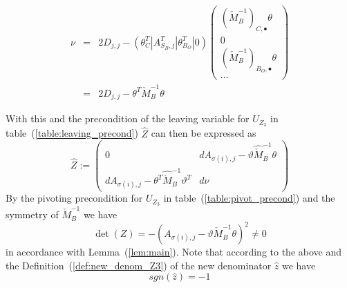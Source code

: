 \documentclass[a4paper]{article}
\begin{document}
\begin{eqnarray}
\nu
&=&
2D_{j,j}
-\left(
  \theta_{C}^{T}\left|\right.A_{S_{B}, j}^{T}\left|\right.
  \theta_{B_{O}}^{T} \left|\right. 0
 \right)
\left(
\begin{array}{c}
\left(\check{M}_{B}^{-1}\right)_{C,\bullet}\theta
\\
\hline
0
\\
\hline
\left(\check{M}_{B}^{-1}\right)_{B_{O}, \bullet}\theta
\\
\hline
\hdots
\end{array}
\right)
\nonumber \\
&=&
2D_{j,j}- \theta^{T} \check{M}_{B}^{-1} \theta
\end{eqnarray}

With this and the precondition of the leaving variable for $U_{Z_{3}}$
in table~(\ref{table:leaving_precond}) $\hat{Z}$ can then be expressed as
\begin{equation}
\hat{Z}:=
\left(
\begin{array}{c|c}
0
&
dA_{\sigma(i),j}
 -\vartheta\hat{\check{M}}_{B}^{-1}\theta
\\
\hline
dA_{\sigma(i),j}
 -\theta^{T}\hat{\check{M}}_{B}^{-1}\vartheta^{T}
&
d\nu
\end{array}
\right)
\end{equation} 
By the pivoting precondition for $U_{Z_{3}}$ in
table~(\ref{table:pivot_precond}) and the symmetry of $\check{M}_{B}^{-1}$
we have 
\begin{equation}
\det(Z)=-\left(A_{\sigma(i),j}
 -\vartheta\check{M}_{B}^{-1}\theta
\right)^{2} \neq 0
\end{equation}
in accordance with Lemma~(\ref{lem:main}). Note that according to the above and
the Definition~(\ref{def:new_denom_Z3}) of the new denominator $\hat{z}$
we have 
\begin{equation}
\label{eq:sign_of_new_denom_Z3}
sgn(\hat{z})=-1
\end{equation}
\end{document}
